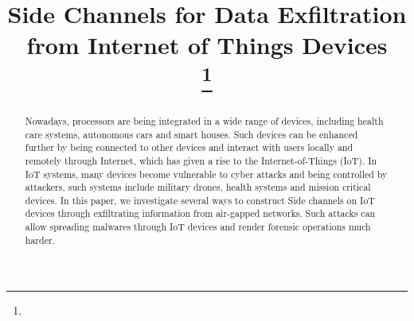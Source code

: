 \documentclass[conference]{IEEEtran}
\begin{document}
\title{Side Channels for Data Exfiltration from Internet of Things Devices\\
{\footnotesize \textsuperscript{}}
\thanks{}
}

\author{
\and
{}
\and
{}
\and
{}
}

\maketitle

\begin{abstract}

Nowadays, processors are being integrated in a wide range of devices, including health care systems, autonomous cars and smart houses. Such devices can be enhanced further by being connected to other devices and interact with users locally and remotely through Internet, which has given a rise to the Internet-of-Things (IoT). In IoT systems, many devices become vulnerable to cyber attacks and being controlled by attackers, such systems include military drones, health systems and mission critical devices. In this paper, we investigate several ways to construct Side channels on IoT devices through  exfiltrating information from air-gapped networks. Such attacks can allow spreading malwares through IoT devices and render forensic operations much harder.

\end{abstract}
\end{document}
